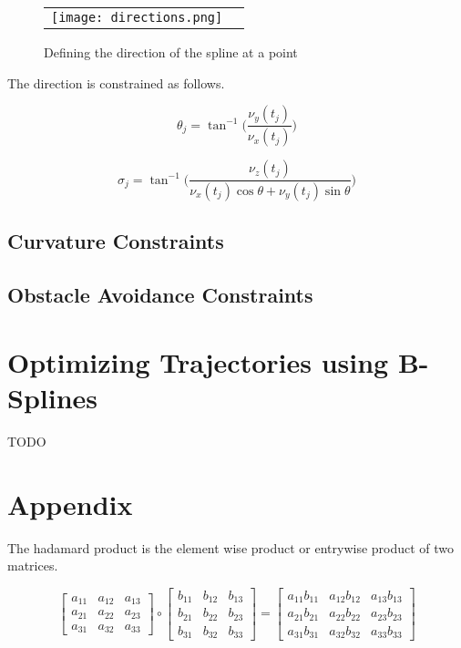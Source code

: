 \documentclass{article}
\begin{document}
\begin{figure}[h]
\begin{tabular}{ll}
\texttt{[image: directions.png]}
\end{tabular}
\caption{Defining the direction of the spline at a point}
\label{Fig:directions.png}
\end{figure}

The direction is constrained as follows.

\begin{equation}
    \theta_j = \tan^{-1} \Big( \frac{\nu_y(t_j)}{\nu_x(t_j)}\Big)
\end{equation}

\begin{equation}
    \sigma_j = \tan^{-1} \Big(\frac{\nu_z(t_j)}{\nu_x(t_j)\cos\theta + \nu_y(t_j) \sin\theta}  \Big)
\end{equation}

\subsection{Curvature Constraints}

\subsection{Obstacle Avoidance Constraints}

\section{Optimizing Trajectories using B-Splines}

TODO

\section{Appendix}

The hadamard product is the element wise product or entrywise product of two matrices.

\begin{equation}
    \begin{bmatrix}
    a_{11} & a_{12} & a_{13} \\
    a_{21} & a_{22} & a_{23} \\
    a_{31} & a_{32} & a_{33}
    \end{bmatrix} \circ
    \begin{bmatrix}
    b_{11} & b_{12} & b_{13} \\
    b_{21} & b_{22} & b_{23} \\
    b_{31} & b_{32} & b_{33}
    \end{bmatrix} = 
    \begin{bmatrix}
    a_{11}b_{11} & a_{12}b_{12} & a_{13}b_{13} \\
    a_{21}b_{21} & a_{22}b_{22} & a_{23}b_{23} \\
    a_{31}b_{31} & a_{32}b_{32} & a_{33}b_{33}
    \end{bmatrix}
\end{equation}
\end{document}
